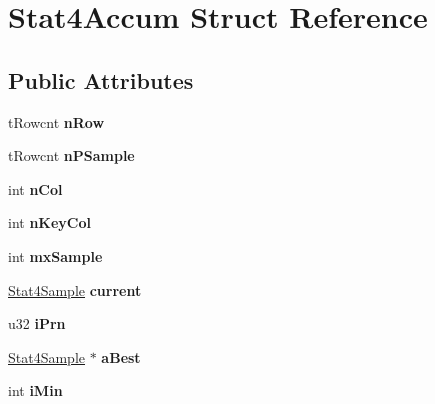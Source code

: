 \hypertarget{struct_stat4_accum}{}\section{Stat4\+Accum Struct Reference}
\label{struct_stat4_accum}
\subsection*{Public Attributes}
\begin{DoxyCompactItemize}
\item 
\mbox{\label{struct_stat4_accum_a7f06c1f2e4790e21b25aa68e5340f0b3}} 
t\+Rowcnt {\bfseries n\+Row}
\item 
\mbox{\label{struct_stat4_accum_ac86c036108462008795ebfb7994ff674}} 
t\+Rowcnt {\bfseries n\+P\+Sample}
\item 
\mbox{\label{struct_stat4_accum_a4b5d9944be8bd28e2dcaaa10d23702db}} 
int {\bfseries n\+Col}
\item 
\mbox{\label{struct_stat4_accum_a018b3aa526f4d376e55042e290c935c4}} 
int {\bfseries n\+Key\+Col}
\item 
\mbox{\label{struct_stat4_accum_a2133206dd5209b1b0fce485bc6d48043}} 
int {\bfseries mx\+Sample}
\item 
\mbox{\label{struct_stat4_accum_a9e65f562b6944448edde933a6d29fdf2}} 
\mbox{\hyperlink{struct_stat4_sample}{Stat4\+Sample}} {\bfseries current}
\item 
\mbox{\label{struct_stat4_accum_a13746aceec404f569af80ee44c9315ac}} 
u32 {\bfseries i\+Prn}
\item 
\mbox{\label{struct_stat4_accum_a634729ee0061b7243e770b6281d9a7a4}} 
\mbox{\hyperlink{struct_stat4_sample}{Stat4\+Sample}} $\ast$ {\bfseries a\+Best}
\item 
\mbox{\label{struct_stat4_accum_a9935fae376aa4010a0d205e7a3283d36}} 
int {\bfseries i\+Min}
\item 
\mbox{\label{struct_stat4_accum_ae96fc8b759131bd3d968086a009a9170}} 

\end{DoxyCompactItemize}
